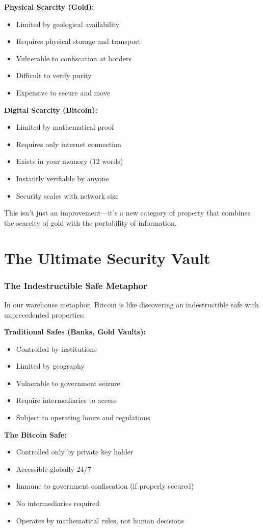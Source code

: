 \documentclass[11pt,oneside]{book}
\begin{document}
\textbf{Physical Scarcity (Gold):}
\begin{itemize}
\item Limited by geological availability
\item Requires physical storage and transport
\item Vulnerable to confiscation at borders
\item Difficult to verify purity
\item Expensive to secure and move
\end{itemize}

\textbf{Digital Scarcity (Bitcoin):}
\begin{itemize}
\item Limited by mathematical proof
\item Requires only internet connection
\item Exists in your memory (12 words)
\item Instantly verifiable by anyone
\item Security scales with network size
\end{itemize}

This isn't just an improvement—it's a new category of property that combines the scarcity of gold with the portability of information.

\section{The Ultimate Security Vault}

\subsubsection{The Indestructible Safe Metaphor}

In our warehouse metaphor, Bitcoin is like discovering an indestructible safe with unprecedented properties:

\textbf{Traditional Safes (Banks, Gold Vaults):}
\begin{itemize}
\item Controlled by institutions
\item Limited by geography
\item Vulnerable to government seizure
\item Require intermediaries to access
\item Subject to operating hours and regulations
\end{itemize}

\textbf{The Bitcoin Safe:}
\begin{itemize}
\item Controlled only by private key holder
\item Accessible globally 24/7
\item Immune to government confiscation (if properly secured)
\item No intermediaries required
\item Operates by mathematical rules, not human decisions
\end{itemize}
\end{document}
